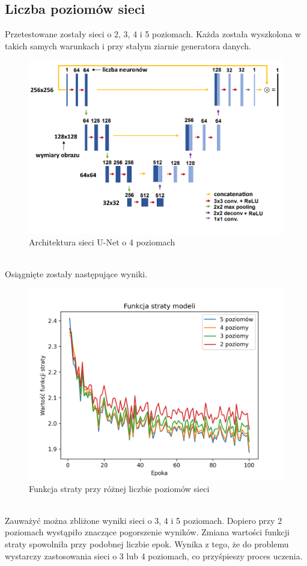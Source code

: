 \documentclass[a4paper,11pt]{article}
\begin{document}
\subsection{Liczba poziomów sieci}
Przetestowane zostały sieci o 2, 3, 4 i 5 poziomach. Każda została wyszkolona w takich samych warunkach i przy stałym ziarnie generatora danych.
\begin{figure}[h!]
\begin{center}
	\includegraphics[width=0.9\columnwidth]{unet4.png}
	\caption{Architektura sieci U-Net o 4 poziomach}
\end{center}
\end{figure}
\\
Osiągnięte zostały następujące wyniki.
\\
\begin{figure}[h!]
\begin{center}
	\includegraphics[width=0.7\columnwidth]{layers.png}
	\caption{Funkcja straty przy różnej liczbie poziomów sieci}
\end{center}
\end{figure}
\\
Zauważyć można zbliżone wyniki sieci o 3, 4 i 5 poziomach.
Dopiero przy 2 poziomach wystąpiło znaczące pogorszenie wyników. Zmiana wartości funkcji straty spowolniła przy podobnej liczbie epok.
Wynika z tego, że do problemu wystarczy zastosowania sieci o 3 lub 4 poziomach, co przyśpieszy proces uczenia.
\end{document}
